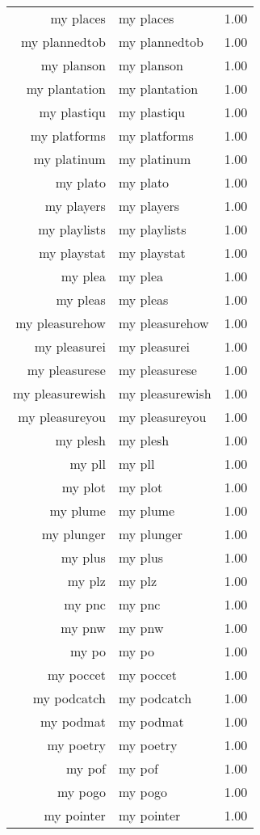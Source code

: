 \begin{table}[ht]
\begin{tabular}{rlr}
  my places & my places & 1.00 \\ 
  my plannedtob & my plannedtob & 1.00 \\ 
  my planson & my planson & 1.00 \\ 
  my plantation & my plantation & 1.00 \\ 
  my plastiqu & my plastiqu & 1.00 \\ 
  my platforms & my platforms & 1.00 \\ 
  my platinum & my platinum & 1.00 \\ 
  my plato & my plato & 1.00 \\ 
  my players & my players & 1.00 \\ 
  my playlists & my playlists & 1.00 \\ 
  my playstat & my playstat & 1.00 \\ 
  my plea & my plea & 1.00 \\ 
  my pleas & my pleas & 1.00 \\ 
  my pleasurehow & my pleasurehow & 1.00 \\ 
  my pleasurei & my pleasurei & 1.00 \\ 
  my pleasurese & my pleasurese & 1.00 \\ 
  my pleasurewish & my pleasurewish & 1.00 \\ 
  my pleasureyou & my pleasureyou & 1.00 \\ 
  my plesh & my plesh & 1.00 \\ 
  my pll & my pll & 1.00 \\ 
  my plot & my plot & 1.00 \\ 
  my plume & my plume & 1.00 \\ 
  my plunger & my plunger & 1.00 \\ 
  my plus & my plus & 1.00 \\ 
  my plz & my plz & 1.00 \\ 
  my pnc & my pnc & 1.00 \\ 
  my pnw & my pnw & 1.00 \\ 
  my po & my po & 1.00 \\ 
  my poccet & my poccet & 1.00 \\ 
  my podcatch & my podcatch & 1.00 \\ 
  my podmat & my podmat & 1.00 \\ 
  my poetry & my poetry & 1.00 \\ 
  my pof & my pof & 1.00 \\ 
  my pogo & my pogo & 1.00 \\ 
  my pointer & my pointer & 1.00 \\ 

\end{tabular}
\end{table}
